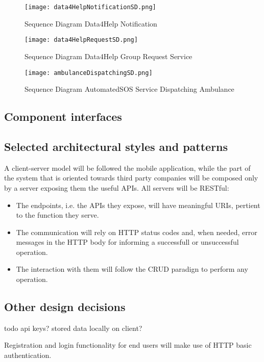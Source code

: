 \documentclass[../main.tex]{subfiles}
\begin{document}
\vspace*{2cm}

\begin{figure}[H]
        \centering
             \texttt{[image: data4HelpNotificationSD.png]}
              \caption{Sequence Diagram Data4Help Notification  }
               \label{fig:data4HelpSD}
\end{figure}

\vspace*{2cm}

\begin{figure}[H]
        \centering
             \texttt{[image: data4HelpRequestSD.png]}
              \caption{Sequence Diagram Data4Help Group Request Service }
               \label{fig:data4HelpRequestSD}
\end{figure}

\vspace*{2cm}

\begin{figure}[H]
        \centering
             \texttt{[image: ambulanceDispatchingSD.png]}
              \caption{Sequence Diagram AutomatedSOS Service Dispatching Ambulance}
               \label{fig:ambulanceDispatchingSD}
\end{figure}

\subsection{Component interfaces}

\subsection{Selected architectural styles and patterns}

A client-server model will be followed the mobile application, while the part of the system that is oriented towards third party companies will be composed only by a server exposing them the useful APIs. All servers will be RESTful:
\begin{itemize}
	\item The endpoints, i.e. the APIs they expose, will have meaningful URIs, pertient to the function they serve.
	\item The communication will rely on HTTP status codes and, when needed, error messages in the HTTP body for informing a successfull or unsuccessful operation.
	\item The interaction with them will follow the CRUD paradign to perform any operation.
\end{itemize}


\subsection{Other design decisions}

todo api keys? stored data locally on client?

Registration and login functionality for end users will make use of HTTP basic authentication.
\end{document}
